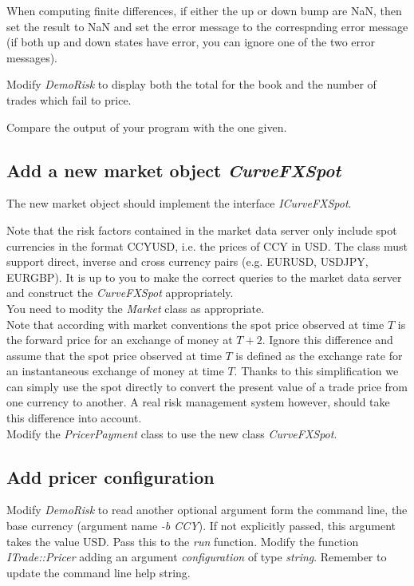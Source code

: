 \documentclass[10pt]{article}
\begin{document}
When computing finite differences, if either the up or down bump are NaN, then set the result to NaN and set the error message to the correspnding error message (if both up and down states have error, you can ignore one of the two error messages).

Modify \textit{DemoRisk} to display both the total for the book and the number of trades which fail to price.

Compare the output of your program with the one given.

\subsection{Add a new market object \textit{CurveFXSpot}}
\label{sec:fxspot}
The new market object should implement the interface \textit{ICurveFXSpot}.

Note that the risk factors contained in the market data server only include spot currencies in the format CCYUSD, i.e. the prices of CCY in USD. The class must support direct, inverse and cross currency pairs (e.g. EURUSD, USDJPY, EURGBP). It is up to you to make the correct queries to the market data server and construct the \textit{CurveFXSpot} appropriately.\\

You need to modity the \textit{Market} class as appropriate.\\

Note that according with market conventions the spot price observed at time $T$ is the forward price for an exchange of money at $T+2$. Ignore this difference and assume that the spot price observed at time $T$ is defined as the exchange rate for an instantaneous exchange of money at time $T$. Thanks to this simplification we can simply use the spot directly to convert the present value of a trade price from one currency to another. A real risk management system however, should take this difference into account.\\

Modify the \textit{PricerPayment} class to use the new class \textit{CurveFXSpot}.

\subsection{Add pricer configuration}
Modify \textit{DemoRisk} to read another optional argument form the command line, the base currency (argument name \textit{-b CCY}). If not explicitly passed, this argument takes the value USD. Pass this to the \textit{run} function.
Modify the function \textit{ITrade::Pricer} adding an argument \textit{configuration} of type \textit{string}. Remember to update the command line help string.
\end{document}
